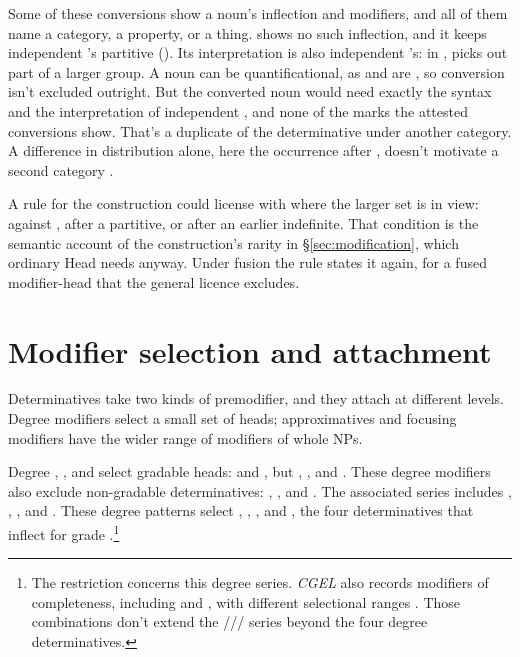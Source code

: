 \documentclass[12pt]{article}
\begin{document}
Some of these conversions show a noun's inflection and modifiers, and all of them name a category, a property, or a thing.  shows no such inflection, and it keeps independent 's partitive (). Its interpretation is also independent 's: in ,  picks out part of a larger group. A noun can be quantificational, as  and  are \citep[349--350]{huddleston2002}, so conversion isn't excluded outright. But the converted noun would need exactly the syntax and the interpretation of independent , and none of the marks the attested conversions show. That's a duplicate of the determinative under another category. A difference in distribution alone, here the occurrence after , doesn't motivate a second category \citep[1, 20]{reynolds2024why}.

A rule for the construction could license  with  where the larger set is in view: against , after a partitive, or after an earlier indefinite. That condition is the semantic account of the construction's rarity in §\ref{sec:modification}, which ordinary Head needs anyway. Under fusion the rule states it again, for a fused modifier-head that the general licence excludes.

\section{Modifier selection and attachment}\label{sec:attachment}

Determinatives take two kinds of premodifier, and they attach at different levels. Degree modifiers select a small set of heads; approximatives and focusing modifiers have the wider range of modifiers of whole NPs.

Degree , , and  select gradable heads:  and , but , , and . These degree modifiers also exclude non-gradable determinatives: , , and . The associated series includes , , , and . These degree patterns select , , , and , the four determinatives that inflect for grade \citep[393--395, 431--432]{huddleston2002}.\footnote{The restriction concerns this degree series. \textit{CGEL} also records modifiers of completeness, including  and , with different selectional ranges \citep[432]{huddleston2002}. Those combinations don't extend the /// series beyond the four degree determinatives.}
\end{document}
